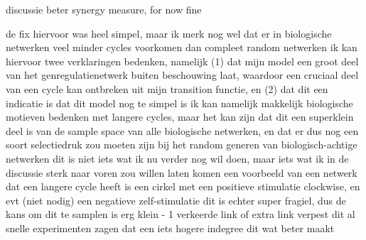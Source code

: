 \documentclass[../main.tex]{subfiles}
\begin{document}


discussie beter synergy measure, for now fine


de fix hiervoor was heel simpel, maar ik merk nog wel dat er in biologische netwerken veel minder cycles voorkomen dan compleet random netwerken
ik kan hiervoor twee verklaringen bedenken, namelijk (1) dat mijn model een groot deel van het genregulatienetwerk buiten beschouwing laat, waardoor een cruciaal deel van een cycle kan ontbreken uit mijn transition functie, en (2) dat dit een indicatie is dat dit model nog te simpel is
ik kan namelijk makkelijk biologische motieven bedenken met langere cycles, maar het kan zijn dat dit een superklein deel is van de sample space van alle biologische netwerken, en dat er dus nog een soort selectiedruk zou moeten zijn bij het random generen van biologisch-achtige netwerken
dit is niet iets wat ik nu verder nog wil doen, maar iets wat ik in de discussie sterk naar voren zou willen laten komen
een voorbeeld van een netwerk dat een langere cycle heeft is een cirkel met een positieve stimulatie clockwise, en evt (niet nodig) een negatieve zelf-stimulatie
dit is echter super fragiel, dus de kans om dit te samplen is erg klein - 1 verkeerde link of extra link verpest dit al
snelle experimenten zagen dat een iets hogere indegree dit wat beter maakt
\end{document}
